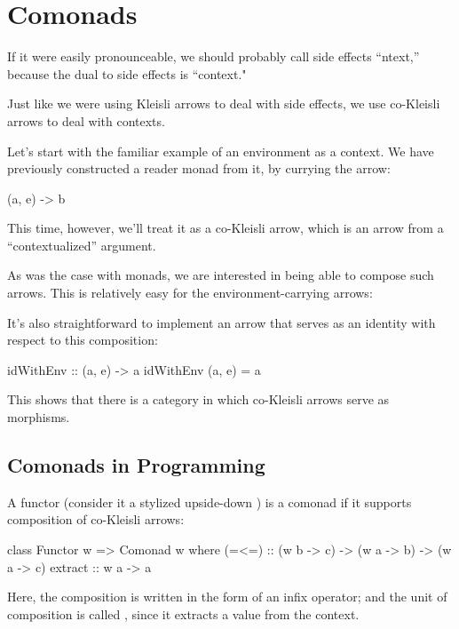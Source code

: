 \documentclass[DaoFP]{subfiles}
\begin{document}
\setcounter{chapter}{15}

\chapter{Comonads}

If it were easily pronounceable, we should probably call side effects ``ntext,'' because the dual to side effects is ``context."

Just like we were using Kleisli arrows to deal with side effects, we use co-Kleisli arrows to deal with contexts. 

Let's start with the familiar example of an environment as a context. We have previously constructed a reader monad from it, by currying the arrow:
\begin{haskell}
(a, e) -> b
\end{haskell}
This time, however, we'll treat it as a co-Kleisli arrow, which is an arrow from a ``contextualized'' argument.

As was the case with monads, we are interested in being able to compose such arrows. This is relatively easy for the environment-carrying arrows:

It's also straightforward to implement an arrow that serves as an identity with respect to this composition:

\begin{haskell}
idWithEnv :: (a, e) -> a
idWithEnv (a, e) = a
\end{haskell}

This shows that there is a category in which co-Kleisli arrows serve as morphisms. 

\section{Comonads in Programming}

A functor  (consider it a stylized upside-down ) is a comonad if it supports composition of co-Kleisli arrows:

\begin{haskell}
class Functor w => Comonad w where
   (=<=) :: (w b -> c) -> (w a -> b) -> (w a -> c)
   extract :: w a -> a
\end{haskell}
Here, the composition is written in the form of an infix operator; and the unit of composition is called , since it extracts a value from the context. 
\end{document}
